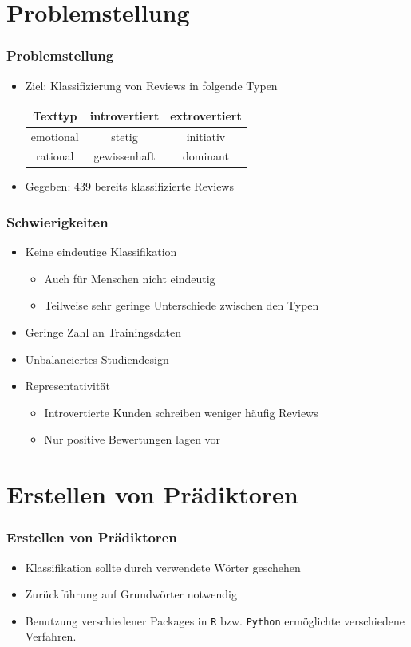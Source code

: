 \documentclass{beamer}
\begin{document}
\section{Problemstellung}
\begin{frame}
\frametitle{Problemstellung}
\begin{itemize}\setlength\parskip{12pt}
\item Ziel: Klassifizierung von Reviews in folgende Typen
\begin{center}
\begin{tabular}{c|c|c}
Texttyp & introvertiert & extrovertiert \\
\hline 
emotional & stetig & initiativ\\
rational & gewissenhaft & dominant
\end{tabular}
\end{center}
\item Gegeben: 439 bereits klassifizierte Reviews
\end{itemize}
\end{frame}
\begin{frame}
\frametitle{Schwierigkeiten}
\begin{itemize}
\item Keine eindeutige Klassifikation
\begin{itemize}
\item Auch für Menschen nicht eindeutig
\item Teilweise sehr geringe Unterschiede zwischen den Typen
\end{itemize}
\item Geringe Zahl an Trainingsdaten
\item Unbalanciertes Studiendesign
\item Representativität
\begin{itemize}
\item Introvertierte Kunden schreiben weniger häufig Reviews
\item Nur positive Bewertungen lagen vor
\end{itemize}
\end{itemize}
\end{frame}


\section{Erstellen von Prädiktoren}
\begin{frame}
\frametitle{Erstellen von Prädiktoren}
\begin{itemize}\itemsep12pt
\item Klassifikation sollte durch verwendete Wörter geschehen
\item Zurückführung auf Grundwörter notwendig
\item Benutzung verschiedener Packages in \texttt{R} bzw. \texttt{Python} ermöglichte verschiedene Verfahren.
\end{itemize}
\end{frame}
\end{document}
